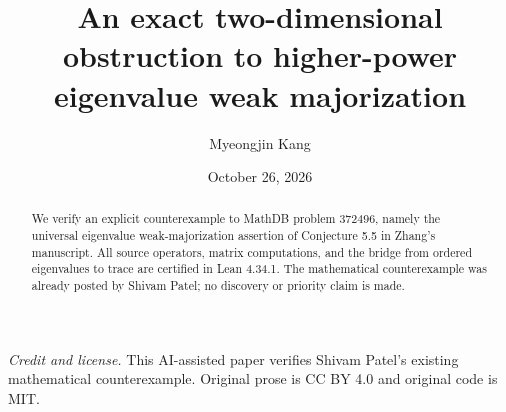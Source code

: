 \documentclass[11pt]{article}
\title{An exact two-dimensional obstruction to higher-power eigenvalue weak majorization}
\author{Myeongjin Kang}
\date{October 26, 2026}
\begin{document}
\maketitle
\begin{abstract}
We verify an explicit counterexample to MathDB problem 372496, namely the universal eigenvalue weak-majorization assertion of Conjecture 5.5 in Zhang's manuscript. All source operators, matrix computations, and the bridge from ordered eigenvalues to trace are certified in Lean 4.34.1. The mathematical counterexample was already posted by Shivam Patel; no discovery or priority claim is made.
\end{abstract}
\noindent\textit{Credit and license.} This AI-assisted paper verifies Shivam Patel's existing mathematical counterexample. Original prose is CC BY 4.0 and original code is MIT.
\end{document}
